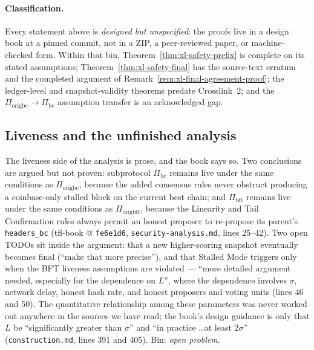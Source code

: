 \documentclass[11pt,a4paper]{article}
\theoremstyle{definition}
\begin{document}
\paragraph{Classification.} Every statement above is \emph{designed but
unspecified}: the proofs live in a design book at a pinned commit, not in
a ZIP, a peer-reviewed paper, or machine-checked form. Within that bin,
Theorem~\ref{thm:xl-safety-prefix} is complete on its stated assumptions;
Theorem~\ref{thm:xl-safety-final} has the source-text erratum and the
completed argument of Remark~\ref{rem:xl-final-agreement-proof}; the ledger-level and
snapshot-validity theorems predate Crosslink~2; and the
$\Pi_{\mathrm{origbc}} \to \Pi_{\mathrm{bc}}$ assumption transfer is an
acknowledged gap.
\subsection{Liveness and the unfinished analysis}\label{sec:xl-liveness}

The liveness side of the analysis is prose, and the book says so. Two
conclusions are argued but not proven: subprotocol $\Pi_{\mathrm{bc}}$
remains live under the same conditions as $\Pi_{\mathrm{origbc}}$, because
the added consensus rules never obstruct producing a coinbase-only stalled
block on the current best chain; and $\Pi_{\mathrm{bft}}$ remains live
under the same conditions as $\Pi_{\mathrm{origbft}}$, because the
Linearity and Tail Confirmation rules always permit an honest proposer to
re-propose its parent's \texttt{headers\_bc} (tfl-book @ \texttt{fe6e1d6},
\texttt{security-analysis.md}, lines 25--42). Two open TODOs sit inside
the argument: that a new higher-scoring snapshot eventually becomes final
(``make that more precise''), and that Stalled Mode triggers only when the
BFT liveness assumptions are violated --- ``more detailed argument needed,
especially for the dependence on $L$'', where the dependence involves
$\sigma$, network delay, honest hash rate, and honest proposers and voting
units (lines 46 and 50). The quantitative relationship among these
parameters was never worked out anywhere in the sources we have read; the
book's design guidance is only that $L$ be ``significantly greater than
$\sigma$'' and ``in practice \ldots at least $2\sigma$''
(\texttt{construction.md}, lines 391 and 405). Bin: \emph{open problem}.
\end{document}
